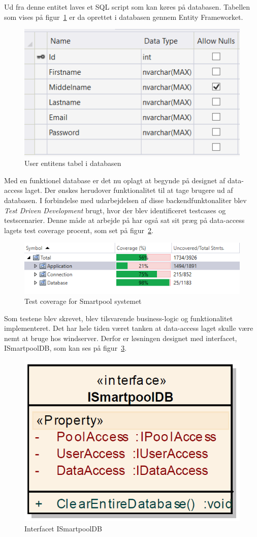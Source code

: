 Ud fra denne entitet laves et SQL script som kan køres på databasen. Tabellen som vises på figur~\ref{fig:usertable} er da oprettet i databasen gennem Entity Frameworket.

\begin{figure}[h]
\centering
\includegraphics[width=0.5\linewidth]{figs/database/usertable}
\caption{User entitens tabel i databasen}
\label{fig:usertable}
\end{figure}

Med en funktionel database er det nu oplagt at begynde på designet af data-access laget. Der ønskes herudover funktionalitet til at tage brugere ud af databasen. I forbindelse med udarbejdelsen af disse backendfunktonaliter blev \textit{Test Driven Development} brugt, hvor der blev identificeret testcases og testscenarier. Denne måde at arbejde på har også sat sit præg på data-access lagets test coverage procent, som set på figur~\ref{fig:coverage}.

\begin{figure}[h]
\centering
\includegraphics[width=0.75\linewidth]{figs/database/coverage.png}
\caption{Test coverage for Smartpool systemet}
\label{fig:coverage}
\end{figure}

Som testene blev skrevet, blev tilsvarende business-logic og funktionalitet implementeret.
Det har hele tiden været tanken at data-access laget skulle være nemt at bruge hos \gls{windserver}. Derfor er løsningen designet med interfacet, ISmartpoolDB, som kan ses på figur~\ref{fig:classISmartpoolDB}.

\begin{figure}[h]
\centering
\includegraphics[width=0.3\linewidth]{figs/database/classISmartpoolDB}
\caption{Interfacet ISmartpoolDB}
\label{fig:classISmartpoolDB}
\end{figure}

